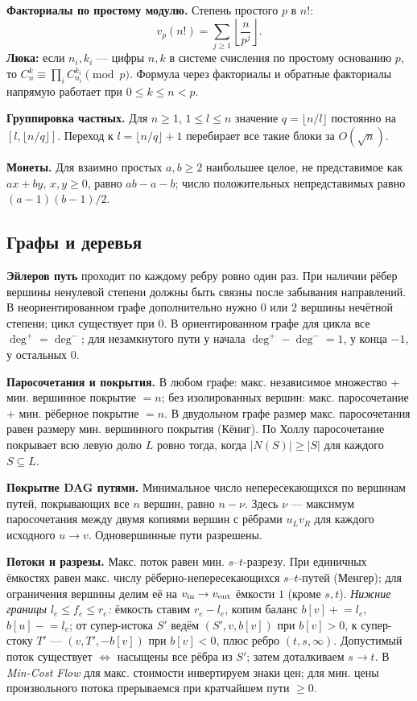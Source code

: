 \textbf{Факториалы по простому модулю.} Степень простого $p$ в $n!$:
\[
  v_p(n!)=\sum_{j\ge1}\left\lfloor\frac{n}{p^j}\right\rfloor.
\]
\textbf{Люка:} если $n_i,k_i$ --- цифры $n,k$ в системе счисления по простому основанию $p$, то
$C_n^k\equiv\prod_i C_{n_i}^{k_i}\pmod p$.
Формула через факториалы и обратные факториалы напрямую работает при $0\le k\le n<p$.

\textbf{Группировка частных.} Для $n\ge1$, $1\le l\le n$ значение $q=\lfloor n/l\rfloor$ постоянно на $[l,\lfloor n/q\rfloor]$. Переход к $l=\lfloor n/q\rfloor+1$ перебирает все такие блоки за $O(\sqrt n)$.

\textbf{Монеты.} Для взаимно простых $a,b\ge2$ наибольшее целое, не представимое как $ax+by$, $x,y\ge0$, равно $ab-a-b$; число положительных непредставимых равно $(a-1)(b-1)/2$.

\subsection{Графы и деревья}
\textbf{Эйлеров путь} проходит по каждому ребру ровно один раз. При наличии рёбер вершины ненулевой степени должны быть связны после забывания направлений.
В неориентированном графе дополнительно нужно $0$ или $2$ вершины нечётной степени; цикл существует при $0$.
В ориентированном графе для цикла все $\deg^+=\deg^-$; для незамкнутого пути у начала $\deg^+-\deg^-=1$, у конца $-1$, у остальных $0$.

\textbf{Паросочетания и покрытия.} В любом графе: макс. независимое множество + мин. вершинное покрытие $= n$; без изолированных вершин: макс. паросочетание + мин. рёберное покрытие $= n$. В двудольном графе размер макс. паросочетания равен размеру мин. вершинного покрытия (Кёниг).
По Холлу паросочетание покрывает всю левую долю $L$ ровно тогда, когда $|N(S)|\ge|S|$ для каждого $S\subseteq L$.

\textbf{Покрытие DAG путями.} Минимальное число непересекающихся по вершинам путей, покрывающих все $n$ вершин, равно $n-\nu$. Здесь $\nu$ --- максимум паросочетания между двумя копиями вершин с рёбрами $u_Lv_R$ для каждого исходного $u\to v$. Одновершинные пути разрешены.

\textbf{Потоки и разрезы.} Макс. поток равен мин. $s$--$t$-разрезу. При единичных ёмкостях равен макс. числу рёберно-непересекающихся $s$--$t$-путей (Менгер); для ограничения вершины делим её на $v_{\rm in}\to v_{\rm out}$ ёмкости $1$ (кроме $s,t$).
\emph{Нижние границы $l_e\le f_e\le r_e$:} ёмкость ставим $r_e-l_e$, копим баланс $b[v]\mathrel{+}=l_e$, $b[u]\mathrel{-}=l_e$; от супер-истока $S'$ ведём $(S',v,b[v])$ при $b[v]>0$, к супер-стоку $T'$ --- $(v,T',-b[v])$ при $b[v]<0$, плюс ребро $(t,s,\infty)$. Допустимый поток существует $\iff$ насыщены все рёбра из $S'$; затем доталкиваем $s\to t$.
В \emph{Min-Cost Flow} для макс. стоимости инвертируем знаки цен; для мин. цены произвольного потока прерываемся при кратчайшем пути $\ge0$.

